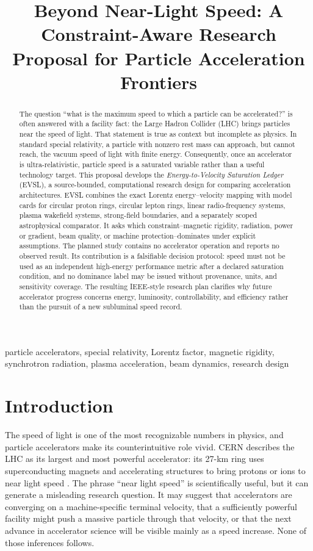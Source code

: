 \documentclass[conference]{../../../../Conference-LaTeX-template_10-17-19/IEEEtran}
\title{Beyond Near-Light Speed: A Constraint-Aware Research Proposal for Particle Acceleration Frontiers}
\author{\IEEEauthorblockN{Anonymous Research Proposal}}
\begin{document}
\maketitle

\begin{abstract}
The question ``what is the maximum speed to which a particle can be accelerated?'' is often answered with a facility fact: the Large Hadron Collider (LHC) brings particles near the speed of light. That statement is true as context but incomplete as physics. In standard special relativity, a particle with nonzero rest mass can approach, but cannot reach, the vacuum speed of light with finite energy. Consequently, once an accelerator is ultra-relativistic, particle speed is a saturated variable rather than a useful technology target. This proposal develops the \emph{Energy-to-Velocity Saturation Ledger} (EVSL), a source-bounded, computational research design for comparing acceleration architectures. EVSL combines the exact Lorentz energy--velocity mapping with model cards for circular proton rings, circular lepton rings, linear radio-frequency systems, plasma wakefield systems, strong-field boundaries, and a separately scoped astrophysical comparator. It asks which constraint--magnetic rigidity, radiation, power or gradient, beam quality, or machine protection--dominates under explicit assumptions. The planned study contains no accelerator operation and reports no observed result. Its contribution is a falsifiable decision protocol: speed must not be used as an independent high-energy performance metric after a declared saturation condition, and no dominance label may be issued without provenance, units, and sensitivity coverage. The resulting IEEE-style research plan clarifies why future accelerator progress concerns energy, luminosity, controllability, and efficiency rather than the pursuit of a new subluminal speed record.
\end{abstract}

\begin{IEEEkeywords}
particle accelerators, special relativity, Lorentz factor, magnetic rigidity, synchrotron radiation, plasma acceleration, beam dynamics, research design
\end{IEEEkeywords}

\section{Introduction}
The speed of light is one of the most recognizable numbers in physics, and particle accelerators make its counterintuitive role vivid. CERN describes the LHC as its largest and most powerful accelerator: its 27-km ring uses superconducting magnets and accelerating structures to bring protons or ions to near light speed \cite{cern_lhc_page}. The phrase ``near light speed'' is scientifically useful, but it can generate a misleading research question. It may suggest that accelerators are converging on a machine-specific terminal velocity, that a sufficiently powerful facility might push a massive particle through that velocity, or that the next advance in accelerator science will be visible mainly as a speed increase. None of those inferences follows.
\end{document}
